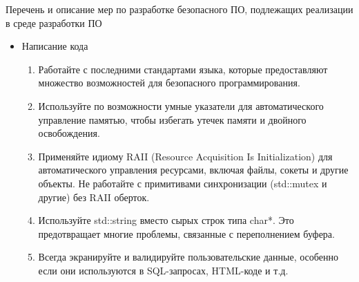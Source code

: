 \documentclass[10pt]{beamer}
\begin{document}
\begin{frame}{Перечень и описание мер по разработке безопасного ПО, подлежащих реализации в среде разработки ПО}
    \begin{itemize}
        \item Написание кода
        \begin{enumerate}
            \item Работайте с последними стандартами языка, которые предоставляют множество возможностей для безопасного программирования.
            \item Используйте по возможности умные указатели для автоматического управление памятью, чтобы избегать утечек памяти и двойного освобождения.
            \item Применяйте идиому RAII (Resource Acquisition Is Initialization) для автоматического управления ресурсами, включая файлы, сокеты и другие объекты. Не работайте с примитивами синхронизации (std::mutex и другие) без RAII оберток.
            \item Используйте std::string вместо сырых строк типа char*. Это предотвращает многие проблемы, связанные с переполнением буфера.
            \item Всегда экранируйте и валидируйте пользовательские данные, особенно если они используются в SQL-запросах, HTML-коде и т.д.
        \end{enumerate}
    \end{itemize}

\end{frame}
\end{document}

